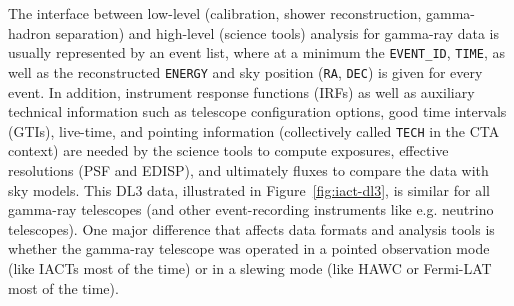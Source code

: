 The interface between low-level (calibration, shower reconstruction, gamma-hadron separation) and high-level (science tools) analysis for gamma-ray data is usually represented by an event list, where at a minimum the \texttt{EVENT\_ID}, \texttt{TIME}, as well as the reconstructed \texttt{ENERGY} and sky position (\texttt{RA}, \texttt{DEC}) is given for every event. In addition, instrument response functions (IRFs) as well as auxiliary technical information such as telescope configuration options, good time intervals (GTIs), live-time, and pointing information (collectively called \texttt{TECH} in the CTA context) are needed by the science tools to compute exposures, effective resolutions (PSF and EDISP), and ultimately fluxes to compare the data with sky models. This DL3 data, illustrated in Figure~\ref{fig:iact-dl3}, is similar for all gamma-ray telescopes (and other event-recording instruments like e.g. neutrino telescopes). One major difference that affects data formats and analysis tools is whether the gamma-ray telescope was operated in a pointed observation mode (like IACTs most of the time) or in a slewing mode (like HAWC or Fermi-LAT most of the time).

